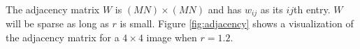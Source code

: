The adjacency matrix $W$ is $(MN) \times (MN)$ and has $w_{ij}$ as its $ij$th entry. 
$W$ will be sparse as long as $r$ is small. 
Figure \ref{fig:adjacency} shows a visualization of the adjacency matrix for a $4 \times 4$ image when $r=1.2$.

\begin{comment}
Now let us define the adjacency matrix of the graph associated to an image. 
Since an $M \times N$ image has $M \times N$ pixels, the adjacency matrix will be $(M \times N) \times (M \times N)$.
After choosing a radius $r$ and some scaling factors $\sigma_I$ and $\sigma_d$, we define the adjacency matrix to be $W = (w_{ij})$, where

\begin{equation}
\label{eq:adjacency}
w_{ij} = \begin{cases} \exp(-\frac{|I(i) - I(j)|}{\sigma_I^2}-\frac{d(i,j)}{\sigma_d^2}) & \mbox{ for $d(i,j) < r$} \\ 0 & \mbox{ otherwise,} \end{cases}
\end{equation}
where
\begin{itemize}
	\item$d(i,j)$ is the Euclidean distance between pixel $i$ and pixel $j$.
	\item $|I(i) - I(j)|$ is the difference in brightness of pixels $i$ and $j$.
\end{itemize}

$W$ will be sparse as long as $r$ is small. 
Figure \ref{fig:adjacency} shows what the adjacency matrix looks like for a $4x4$ image when $r=1.2$.
\end{comment}

